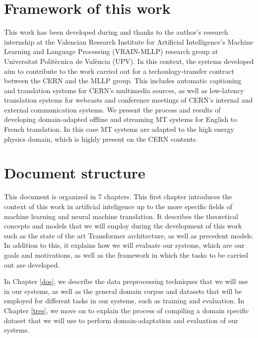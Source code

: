\documentclass[11pt,english,listoffigures,listoftables]{tfgetsinf}
\begin{document}


\section{Framework of this work}\label{framework}
This work has been developed during and thanks to the author's research internship at the Valencian Research Institute for Artificial Intelligence’s Machine Learning and Language Processing (VRAIN-MLLP) research group at Universitat Politècnica de València (UPV). In this context, the systems developed aim to contribute to the work carried out for a techonlogy-transfer contract between the CERN and the MLLP group. This includes automatic captioning and translation systems for CERN's multimedia sources, as well as low-latency translation systems for webcasts and conference meetings of CERN's internal and external communication systems. We present the process and results of developing domain-adapted offline and streaming MT systems for English to French translation. In this case MT systems are adapted to the high energy physics domain, which is highly present on the CERN contents.


\section{Document structure}

This document is organized in 7 chapters. This first chapter introduces the context of this work in artificial inteligence up to the more specific fields of machine learning and neural machine translation. It describes the theoretical concepts and models that we will employ during the development of this work such as the state of the art Transformer architecture, as well as precedent models. In addition to this, it explains how we will evaluate our systems, which are our goals and motivations, as well as the framework in which the tasks to be carried out are developed. 

In Chapter \ref{dos}, we describe the data preprocessing techniques that we will use in our systems, as well as the general domain corpus and datasets that will be employed for different tasks in our systems, such as training and evaluation. In Chapter \ref{tres}, we move on to explain the process of compiling a domain specific dataset that we will use to perform domain-adaptation and evaluation of our systems.
\end{document}
